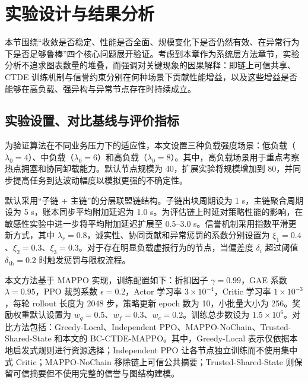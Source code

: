 \documentclass[UTF8,12pt,oneside]{ctexbook}
\begin{document}
\section{实验设计与结果分析}

本节围绕“收敛是否稳定、性能是否全面、规模变化下是否仍然有效、在异常行为下是否足够鲁棒”四个核心问题展开验证。考虑到本章作为系统层方法章节，实验分析不追求图表数量的堆叠，而强调对关键现象的因果解释：即链上可信共享、CTDE 训练机制与信誉约束分别在何种场景下贡献性能增益，以及这些增益是否能够在高负载、强异构与异常节点存在时持续成立。

\subsection{实验设置、对比基线与评价指标}

为验证算法在不同业务压力下的适应性，本文设置三种负载强度场景：低负载（$\lambda_0=4$）、中负载（$\lambda_0=6$）和高负载（$\lambda_0=8$）。其中，高负载场景用于重点考察热点拥塞和协同卸载能力。默认节点规模为 40，扩展实验将规模增加到 80，并同步提高任务到达波动幅度以模拟更强的不确定性。

默认采用“子链 + 主链”的分层联盟链结构。子链出块周期设为 1 s，主链聚合周期设为 5 s，账本同步平均附加延迟为 1.0 s。为评估链上时延对策略性能的影响，在敏感性实验中进一步将平均附加延迟扩展至 0.5--3.0 s。信誉机制采用指数平滑更新方式，其中 $\lambda_r=0.8$，诚实性、协同贡献和异常惩罚的系数分别设置为 $\xi_1=0.4$、$\xi_2=0.3$、$\xi_3=0.3$。对于存在明显负载虚报行为的节点，当偏差度 $\delta_i$ 超过阈值 $\delta_{\mathrm{th}}=0.2$ 时触发惩罚与限权流程。

本文方法基于 MAPPO 实现，训练配置如下：折扣因子 $\gamma=0.99$，GAE 系数 $\lambda=0.95$，PPO 裁剪系数 $\epsilon=0.2$，Actor 学习率 $3\times10^{-4}$，Critic 学习率 $1\times10^{-3}$，每轮 rollout 长度为 2048 步，策略更新 epoch 数为 10，小批量大小为 256。奖励权重默认设置为 $w_q=0.5$、$w_f=0.3$、$w_c=0.2$。训练总步数设为 $1.5\times10^6$。对比方法包括：Greedy-Local、Independent PPO、MAPPO-NoChain、Trusted-Shared-State 和本文的 BC-CTDE-MAPPO。其中，Greedy-Local 表示仅依据本地启发式规则进行资源选择；Independent PPO 让各节点独立训练而不使用集中式 Critic；MAPPO-NoChain 移除链上可信公共摘要；Trusted-Shared-State 则保留可信摘要但不使用完整的信誉与图结构建模。
\end{document}
